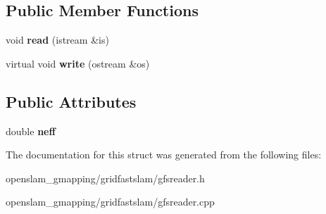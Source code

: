 \subsection*{Public Member Functions}
\begin{DoxyCompactItemize}
\item 
\mbox{\label{structGMapping_1_1GFSReader_1_1NeffRecord_a41d40040ebb0f4104f87f73430e9c525}} 
void {\bfseries read} (istream \&is)
\item 
\mbox{\label{structGMapping_1_1GFSReader_1_1NeffRecord_af272e29faa49e5d20cac5f9ae3a113ed}} 
virtual void {\bfseries write} (ostream \&os)
\end{DoxyCompactItemize}
\subsection*{Public Attributes}
\begin{DoxyCompactItemize}
\item 
\mbox{\label{structGMapping_1_1GFSReader_1_1NeffRecord_afbb3880aab0ee874d73072d4f7bd7e50}} 
double {\bfseries neff}
\end{DoxyCompactItemize}


The documentation for this struct was generated from the following files\+:\begin{DoxyCompactItemize}
\item 
openslam\+\_\+gmapping/gridfastslam/gfsreader.\+h\item 
openslam\+\_\+gmapping/gridfastslam/gfsreader.\+cpp\end{DoxyCompactItemize}
